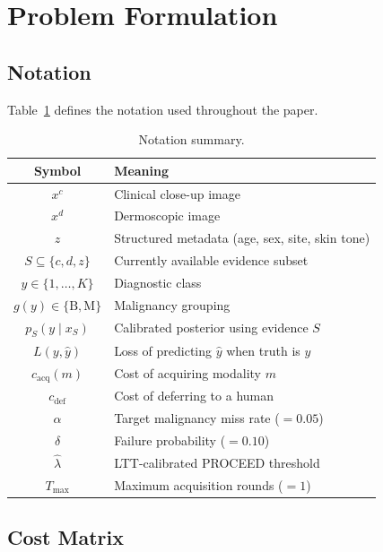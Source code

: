 \documentclass[conference]{IEEEtran}
\newcommand{\1}{\mathbf{1}}
\begin{document}
\section{Problem Formulation}
\label{sec:formulation}

\subsection{Notation}

Table~\ref{tab:notation} defines the notation used throughout the paper.

\begin{table}[H]
  \centering
  \caption{Notation summary.}
  \label{tab:notation}
  \renewcommand{\arraystretch}{1.15}
  \small
  \begin{tabular}{cl}
    \toprule
    \textbf{Symbol} & \textbf{Meaning} \\
    \midrule
    $x^c$ & Clinical close-up image \\
    $x^d$ & Dermoscopic image \\
    $z$   & Structured metadata (age, sex, site, skin tone) \\
    $S \subseteq \{c, d, z\}$ & Currently available evidence subset \\
    $y \in \{1,\ldots,K\}$ & Diagnostic class \\
    $g(y) \in \{\text{B}, \text{M}\}$ & Malignancy grouping \\
    $p_S(y \mid x_S)$ & Calibrated posterior using evidence $S$ \\
    $L(y, \hat{y})$ & Loss of predicting $\hat{y}$ when truth is $y$ \\
    $c_{\text{acq}}(m)$ & Cost of acquiring modality $m$ \\
    $c_{\text{def}}$ & Cost of deferring to a human \\
    $\alpha$ & Target malignancy miss rate ($= 0.05$) \\
    $\delta$ & Failure probability ($= 0.10$) \\
    $\hat{\lambda}$ & LTT-calibrated PROCEED threshold \\
    $T_{\max}$ & Maximum acquisition rounds ($= 1$) \\
    \bottomrule
  \end{tabular}
\end{table}

\subsection{Cost Matrix}
\end{document}
